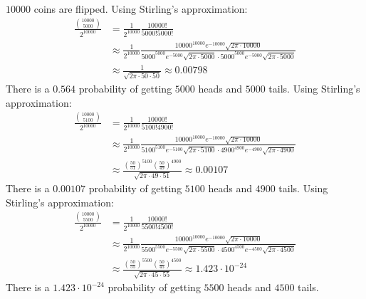 \documentclass{article}
\begin{document}
\problem
{}
$10000$ coins are flipped. Using Stirling's approximation:
\begin{equation}
    \begin{split}
        \frac{{10000 \choose 5000}}{2^{10000}} & = \frac{1}{2^{10000}}\frac{10000!}{5000!5000!} \\
        & \approx \frac{1}{2^{10000}}\frac{10000^{10000}e^{-10000}\sqrt{2\pi \cdot 10000}}{5000^{5000}e^{-5000}\sqrt{2\pi \cdot 5000} \cdot 5000^{5000}e^{-5000}\sqrt{2\pi \cdot 5000}} \\
        & \approx \frac{1}{\sqrt{2\pi \cdot 50 \cdot 50}} \approx 0.00798
    \end{split}
\end{equation}
There is a $0.564$ probability of getting $5000$ heads and $5000$ tails.
Using Stirling's approximation:
\begin{equation}
    \begin{split}
        \frac{{10000 \choose 5100}}{2^{10000}} & = \frac{1}{2^{10000}}\frac{10000!}{5100!4900!} \\
        & \approx \frac{1}{2^{10000}}\frac{10000^{10000}e^{-10000}\sqrt{2\pi \cdot 10000}}{5100^{5100}e^{-5100}\sqrt{2\pi \cdot 5100} \cdot 4900^{4900}e^{-4900}\sqrt{2\pi \cdot 4900}} \\
        & \approx \frac{{\left(\frac{50}{51}\right)}^{5100}(\frac{50}{49})^{4900}}{\sqrt{2\pi \cdot 49 \cdot 51}} \approx 0.00107
    \end{split}
\end{equation}
There is a $0.00107$ probability of getting $5100$ heads and $4900$ tails.
Using Stirling's approximation:
\begin{equation}
    \begin{split}
        \frac{{10000 \choose 5500}}{2^{10000}} & = \frac{1}{2^{10000}}\frac{10000!}{5500!4500!} \\
        & \approx \frac{1}{2^{10000}}\frac{10000^{10000}e^{-10000}\sqrt{2\pi \cdot 10000}}{5500^{5500}e^{-5500}\sqrt{2\pi \cdot 5500} \cdot 4500^{4500}e^{-4500}\sqrt{2\pi \cdot 4500}} \\
        & \approx \frac{{\left(\frac{50}{55}\right)}^{5500}(\frac{50}{45})^{4500}}{\sqrt{2\pi \cdot 45 \cdot 55}} \approx 1.423 \cdot 10^{-24}
    \end{split}
\end{equation}
There is a $1.423 \cdot 10^{-24}$ probability of getting $5500$ heads and $4500$ tails.

\clearpage
\end{document}
